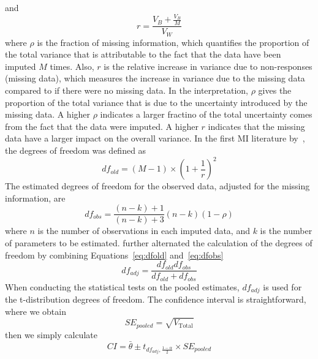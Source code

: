 and 
\begin{equation}
    r=\frac{V_B+\frac{V_B}{M}}{V_W}
\end{equation}
where $\rho$ is the fraction of missing information, which quantifies the proportion of the total variance that is attributable to the fact that the data have been imputed $M$ times. 
Also, $r$ is the relative increase in variance due to non-responses (missing data), which measures the increase in variance due to the missing data compared to if there were no missing data. 
In the interpretation, $\rho$ gives the proportion of the total variance that is due to the uncertainty introduced by the missing data. 
A higher $\rho$ indicates a larger fractino of the total uncertainty comes from the fact that the data were imputed.
A higher $r$ indicates that the missing data have a larger impact on the overall variance. 
In the first MI literature by~\citet{rubin1987multiple}, the degrees of freedom was defined as
\begin{equation}\label{eq:dfold}
    df_{old}=(M-1)\times (1+\frac{1}{r})^2
\end{equation}
The estimated degrees of freedom for the observed data, adjusted for the missing information, are
\begin{equation}\label{eq:dfobs}
    df_{obs}=\frac{(n-k)+1}{(n-k)+3}(n-k)(1-\rho)
\end{equation}
where $n$ is the number of observations in each imputed data, and $k$ is the number of parameters to be estimated.
\citet{barnard1999miscellanea} further alternated the calculation of the degrees of freedom by combining Equations~\ref{eq:dfold} and~\ref{eq:dfobs}
\begin{equation}
    df_{adj}=\frac{df_{old}df_{obs}}{df_{old}+df_{obs}}
\end{equation}
When conducting the statistical tests on the pooled estimates, $df_{adj}$ is used for the t-distribution degrees of freedom. 
The confidence interval is straightforward, where we obtain 
\begin{equation}
    SE_{pooled}=\sqrt{V_{\text{Total}}}
\end{equation}
then we simply calculate 
\begin{equation}
    CI=\bar{\theta}\pm t_{df_{adj},\frac{1-\alpha}{2}}\times SE_{pooled}
\end{equation}